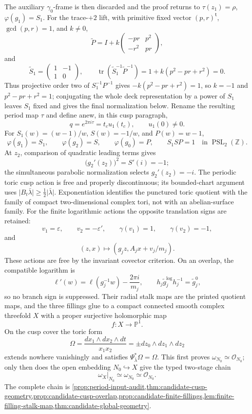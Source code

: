 \begin{enumerate}[leftmargin=1.8em,itemsep=.65em]
The auxiliary $\gamma_0$-frame is then discarded and the proof returns to
$\tau(z_1)=\rho$, $\varphi(g_1)=S_1$.  For the trace-$+2$ lift, with
primitive fixed vector $(p,r)^{\mathsf t}$, $\gcd(p,r)=1$, and $k\ne0$,
\[
 \widetilde P=I+k
 \begin{pmatrix}-pr&p^2\\-r^2&pr\end{pmatrix},
\]
and
\[
 \widetilde S_1=\begin{pmatrix}1&-1\\1&0\end{pmatrix},\qquad
 \operatorname{tr}(\widetilde S_1^{-1}\widetilde P^{-1})
 =1+k(p^2-pr+r^2)=0.
\]
Thus projective order two of $S_1^{-1}P^{-1}$ gives
$-k(p^2-pr+r^2)=1$, so $k=-1$ and
$p^2-pr+r^2=1$; conjugating the whole deck representation by a power of
$S_1$ leaves $S_1$ fixed and gives the final normalization below.  Rename
the resulting period map $\tau$ and define anew, in this cusp paragraph,
\[
 q=e^{2\pi i\tau}=t_cu_1(t_c),\qquad u_1(0)\ne0.
\]
For
\(S_1(w)=(w-1)/w\), \(S(w)=-1/w\), and \(P(w)=w-1\),
\[
 \varphi(g_1)=S_1,\qquad \varphi(g_2)=S,\qquad
 \varphi(g_0)=P,\qquad S_1SP=1
 \quad\text{in }\operatorname{PSL}_2(\mathbb Z).
\]
At $z_2$, comparison of quadratic leading terms gives
\[
 \bigl(g_2'(z_2)\bigr)^2=S'(i)=-1;
\]
the simultaneous parabolic normalization selects $g_2'(z_2)=-i$.
The periodic toric cusp action is free and properly discontinuous; its
bounded-chart argument uses
\(\lvert B_t\bar\lambda\rvert\ge\frac12\lvert\bar\lambda\rvert\).
Exponentiation identifies the punctured toric quotient with the family of
compact two-dimensional complex tori, not with an abelian-surface family.
For the finite logarithmic actions the opposite translation signs are
retained:
\[
 v_1=\varepsilon,\qquad v_2=-\varepsilon',\qquad
 \gamma(v_1)=1,\qquad\gamma(v_2)=-1,
\]
and
\[
 (z,x)\longmapsto(g_jz,A_jx+v_j/m_j).
\]
These actions are free by the invariant covector criterion.  On an overlap,
the compatible logarithm is
\[
 \ell'(w)=\ell(g_j^{-1}w)-\frac{2\pi i}{m_j},
 \qquad
 h_j\widetilde g_j^{\log}h_j^{-1}=\widetilde g_j^0,
\]
so no branch sign is suppressed.  Their radial stalk maps are the printed
quotient maps,
and the three fillings glue to a compact connected smooth complex
threefold \(X\) with a proper surjective holomorphic map
\[
 f:X\longrightarrow\mathbb P^1.
\]
On the cusp cover the toric form
\[
 \Omega=\frac{dx_1\wedge dx_2\wedge dt}{x_1x_2}
       =\pm dz_0\wedge dz_1\wedge dz_2
\]
extends nowhere vanishingly and satisfies
\(\Psi_{\bar\lambda}^*\Omega=\Omega\).  This first proves
\(\omega_{N_0}\simeq\mathcal O_{N_0}\); only then does the open embedding
\(N_0\hookrightarrow X\) give the typed two-stage chain
\[
 \omega_X|_{N_0}\simeq\omega_{N_0}\simeq\mathcal O_{N_0}.
\]
The complete chain is
\cref{prop:period-input-audit,thm:candidate-cusp-geometry,prop:candidate-cusp-overlap,prop:candidate-finite-fillings,lem:finite-filling-stalk-map,thm:candidate-global-geometry}.


\end{enumerate}

